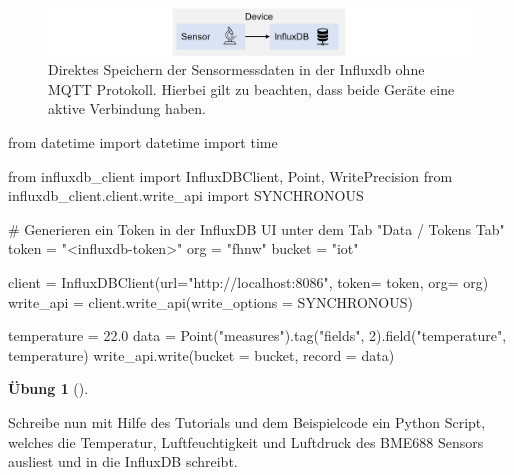 \documentclass[
  11pt,
  a4paperpaper,
  oneside, openany  ,captions=tableheading
]{scrbook}
\newenvironment{Shaded}{\begin{snugshade}}{\end{snugshade}}
\newcommand{\CommentTok}[1]{\textcolor[rgb]{0.37,0.37,0.37}{#1}}
\newcommand{\DecValTok}[1]{\textcolor[rgb]{0.68,0.00,0.00}{#1}}
\newcommand{\FloatTok}[1]{\textcolor[rgb]{0.68,0.00,0.00}{#1}}
\newcommand{\ImportTok}[1]{\textcolor[rgb]{0.00,0.46,0.62}{#1}}
\newcommand{\NormalTok}[1]{\textcolor[rgb]{0.00,0.23,0.31}{#1}}
\newcommand{\OperatorTok}[1]{\textcolor[rgb]{0.37,0.37,0.37}{#1}}
\newcommand{\StringTok}[1]{\textcolor[rgb]{0.13,0.47,0.30}{#1}}
\theoremstyle{definition}
\newtheorem{exercise}{Übung}[chapter]
\theoremstyle{remark}
\begin{document}
\begin{figure}[H]

{\centering \includegraphics{images/mqtt-sensor-influxdb.jpg}

}

\caption{Direktes Speichern der Sensormessdaten in der Influxdb ohne
MQTT Protokoll. Hierbei gilt zu beachten, dass beide Geräte eine aktive
Verbindung haben.}

\end{figure}%

\begin{Shaded}
\begin{Highlighting}[]
\ImportTok{from}\NormalTok{ datetime }\ImportTok{import}\NormalTok{ datetime}
\ImportTok{import}\NormalTok{ time}

\ImportTok{from}\NormalTok{ influxdb\_client }\ImportTok{import}\NormalTok{ InfluxDBClient, Point, WritePrecision}
\ImportTok{from}\NormalTok{ influxdb\_client.client.write\_api }\ImportTok{import}\NormalTok{ SYNCHRONOUS}

\CommentTok{\# Generieren ein Token in der InfluxDB UI unter dem Tab "Data / Tokens Tab"}
\NormalTok{token }\OperatorTok{=} \StringTok{"\textless{}influxdb{-}token\textgreater{}"}
\NormalTok{org }\OperatorTok{=} \StringTok{"fhnw"}
\NormalTok{bucket }\OperatorTok{=} \StringTok{"iot"}

\NormalTok{client }\OperatorTok{=}\NormalTok{ InfluxDBClient(url}\OperatorTok{=}\StringTok{"http://localhost:8086"}\NormalTok{, token}\OperatorTok{=}\NormalTok{ token, org}\OperatorTok{=}\NormalTok{ org)}
\NormalTok{write\_api }\OperatorTok{=}\NormalTok{ client.write\_api(write\_options }\OperatorTok{=}\NormalTok{ SYNCHRONOUS)}

\NormalTok{temperature }\OperatorTok{=} \FloatTok{22.0}
\NormalTok{data }\OperatorTok{=}\NormalTok{ Point(}\StringTok{"measures"}\NormalTok{).tag(}\StringTok{"fields"}\NormalTok{, }\DecValTok{2}\NormalTok{).field(}\StringTok{"temperature"}\NormalTok{, temperature)}
\NormalTok{write\_api.write(bucket }\OperatorTok{=}\NormalTok{ bucket, record }\OperatorTok{=}\NormalTok{ data)}
\end{Highlighting}
\end{Shaded}

\begin{exercise}[]\protect\hypertarget{exr-python-influxb}{}\label{exr-python-influxb}

Schreibe nun mit Hilfe des Tutorials und dem Beispielcode ein Python
Script, welches die Temperatur, Luftfeuchtigkeit und Luftdruck des
BME688 Sensors ausliest und in die InfluxDB schreibt.

\end{exercise}
\end{document}
